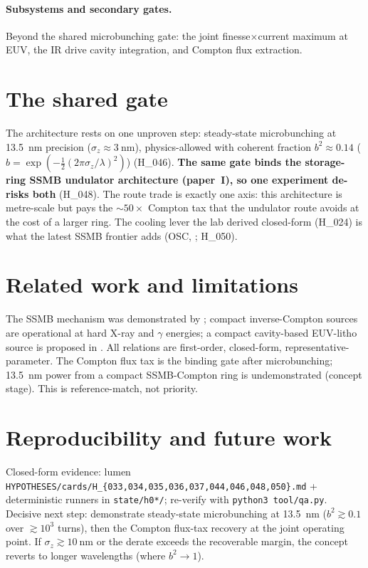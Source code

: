 \documentclass[11pt,a4paper]{article}
\newcommand{\hyp}[1]{\textcolor{blue!45!black}{\textsf{\small #1}}}
\begin{document}
\paragraph{Subsystems and secondary gates.} Beyond the shared microbunching gate: the joint
finesse$\times$current maximum at EUV, the IR drive cavity integration, and Compton flux extraction.

\section{The shared gate}
\label{sec:gate}
The architecture rests on one unproven step: steady-state microbunching at \SI{13.5}{\nano\meter}
precision ($\sigma_z\!\approx\!\SI{3}{\nano\meter}$), physics-allowed with coherent fraction
$b^2\approx0.14$ ($b=\exp(-\tfrac{1}{2}(2\pi\sigma_z/\lambda)^2)$) (\hyp{H\_046}). \textbf{The same
gate binds the storage-ring SSMB undulator architecture (paper~I), so one experiment de-risks both}
(\hyp{H\_048}). The route trade is exactly one axis: this architecture is metre-scale but pays the
$\sim\!50\times$ Compton tax that the undulator route avoids at the cost of a larger ring. The
cooling lever the lab derived closed-form (\hyp{H\_024}) is what the latest SSMB frontier adds (OSC,
\citep{deng2025}; \hyp{H\_050}).

\section{Related work and limitations}
The SSMB mechanism was demonstrated by \citet{deng2021}; compact inverse-Compton sources are
operational at hard X-ray and $\gamma$ energies; a compact cavity-based EUV-litho source is proposed
in \citet{he2025}. All relations are first-order, closed-form, representative-parameter. The Compton
flux tax is the binding gate after microbunching; \SI{13.5}{\nano\meter} power from a compact
SSMB-Compton ring is undemonstrated (concept stage). This is reference-match, not priority.

\section{Reproducibility and future work}
Closed-form evidence: lumen \texttt{HYPOTHESES/cards/H\_\{033,034,035,036,037,044,046,048,050\}.md} +
deterministic runners in \texttt{state/h0*/}; re-verify with \texttt{python3 tool/qa.py}. Decisive
next step: demonstrate steady-state microbunching at \SI{13.5}{\nano\meter} ($b^2\gtrsim0.1$ over
$\gtrsim\!10^{3}$ turns), then the Compton flux-tax recovery at the joint operating point. If
$\sigma_z\gtrsim\!\SI{10}{\nano\meter}$ or the derate exceeds the recoverable margin, the concept
reverts to longer wavelengths (where $b^2\!\to\!1$).



\end{document}
